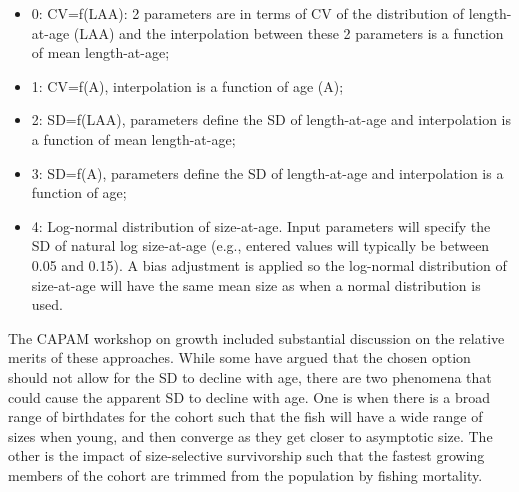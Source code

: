 \begin{itemize}
	\item 0: CV=f(LAA): 2 parameters are in terms of CV of the distribution of
	length-at-age (LAA) and the interpolation between these 2 parameters is a
	function of mean length-at-age;
	\item 1: CV=f(A), interpolation is a function of age (A);
	\item 2: SD=f(LAA), parameters define the SD of length-at-age and 
	interpolation is a function of mean length-at-age;
	\item 3: SD=f(A), parameters define the SD of length-at-age and 
	interpolation is a function of age;
	\item 4: Log-normal distribution of size-at-age. Input parameters will specify the
	SD of natural log size-at-age (e.g., entered values will typically be between
	0.05 and 0.15). A bias adjustment is applied so the log-normal distribution
	of size-at-age will have the same mean size as when a normal distribution
	is used.
\end{itemize}

The CAPAM workshop on growth included substantial discussion on the relative merits of these approaches. While some have argued that the chosen option should not allow for the SD to decline with age, there are two phenomena that could cause the apparent SD to decline with age. One is when there is a broad range of birthdates for the cohort such that the fish will have a wide range of sizes when young, and then converge as they get closer to asymptotic size. The other is the impact of size-selective survivorship such that the fastest growing members of the cohort are trimmed from the population by fishing mortality.

	


